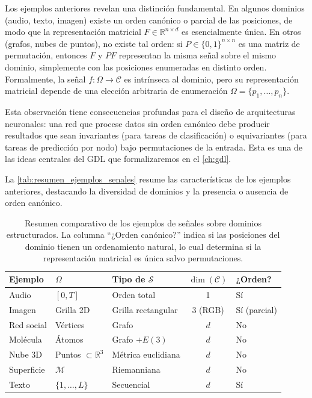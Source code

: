 \begin{remark}\label{rem:invarianza_permutacion}
Los ejemplos anteriores revelan una distinción fundamental. En algunos dominios (audio, texto, imagen) existe un orden canónico o parcial de las posiciones, de modo que la representación matricial $F \in \mathbb{R}^{n \times d}$ es esencialmente única. En otros (grafos, nubes de puntos), no existe tal orden: si $P \in \{0,1\}^{n \times n}$ es una matriz de permutación, entonces $F$ y $PF$ representan la misma señal sobre el mismo dominio, simplemente con las posiciones enumeradas en distinto orden. Formalmente, la señal $f: \Omega \to \mathcal{C}$ es intrínseca al dominio, pero su representación matricial depende de una elección arbitraria de enumeración $\Omega = \{p_1, \ldots, p_n\}$.

Esta observación tiene consecuencias profundas para el diseño de arquitecturas neuronales: una red que procese datos sin orden canónico debe producir resultados que sean invariantes (para tareas de clasificación) o equivariantes (para tareas de predicción por nodo) bajo permutaciones de la entrada. Esta es una de las ideas centrales del \gls{GDL} que formalizaremos en el \autoref{ch:gdl}.
\end{remark}

La \autoref{tab:resumen_ejemplos_senales} resume las características de los ejemplos anteriores, destacando la diversidad de dominios y la presencia o ausencia de orden canónico.

\begin{table}[htbp]
\centering
\caption[Resumen de ejemplos de señales sobre dominios estructurados]{Resumen comparativo de los ejemplos de señales sobre dominios estructurados. La columna ``¿Orden canónico?'' indica si las posiciones del dominio tienen un ordenamiento natural, lo cual determina si la representación matricial es única salvo permutaciones.}
\label{tab:resumen_ejemplos_senales}
\begin{tabular}{lllcl}
\toprule
\textbf{Ejemplo} & $\Omega$ & \textbf{Tipo de} $\mathcal{S}$ & $\dim(\mathcal{C})$ & \textbf{¿Orden?} \\
\midrule
Audio & $[0,T]$ & Orden total & 1 & Sí \\
Imagen & Grilla 2D & Grilla rectangular & 3 (RGB) & Sí (parcial) \\
Red social & Vértices & Grafo & $d$ & No \\
Molécula & Átomos & Grafo $+ E(3)$ & $d$ & No \\
Nube 3D & Puntos $\subset \mathbb{R}^3$ & Métrica euclidiana & $d$ & No \\
Superficie & $\mathcal{M}$ & Riemanniana & $d$ & No \\
Texto & $\{1,\ldots,L\}$ & Secuencial & $d$ & Sí \\
\bottomrule
\end{tabular}
\end{table}

